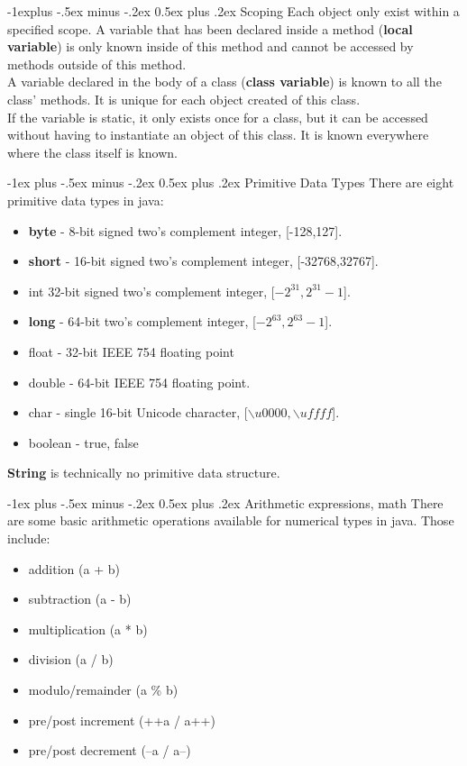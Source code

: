 \documentclass[10pt,landscape]{article}
\makeatletter
\renewcommand{\section}{\@startsection{section}{1}{0mm}%
                                {-1ex plus -.5ex minus -.2ex}%
                                {0.5ex plus .2ex}%
                                {\normalfont\large\bfseries}}
\renewcommand{\subsection}{\@startsection{subsection}{2}{0mm}%
                                {-1explus -.5ex minus -.2ex}%
                                {0.5ex plus .2ex}%
                                {\normalfont\normalsize\bfseries}}
\makeatother
\begin{document}
\begin{multicols}{3}
\subsection{Scoping}
Each object only exist within a specified scope. A variable that has been declared inside a method (\textbf{local variable}) is only known inside of this method and cannot be accessed by methods outside of this method.\\
A variable declared in the body of a class (\textbf{class variable}) is known to all the class' methods. It is unique for each object created of this class.\\
If the variable is static, it only exists once for a class, but it can be accessed without having to instantiate an object of this class. It is known everywhere where the class itself is known.

\section{Primitive Data Types}
There are eight primitive data types in java:
\begin{itemize}
\item \textbf{byte} - 8-bit signed two's complement integer, [-128,127].
\item \textbf{short} - 16-bit signed two's complement integer, [-32768,32767]. 
\item int 32-bit signed two's complement integer, [$-2^{31}, 2^{31}-1$].
\item \textbf{long} - 64-bit two's complement integer, [$-2^{63}, 2^{63}-1$].
\item float - 32-bit IEEE 754 floating point
\item double - 64-bit IEEE 754 floating point.
\item char - single 16-bit Unicode character, [$\backslash u0000, \backslash uffff$].
\item boolean - {true, false}
\end{itemize}
\textbf{String} is technically no primitive data structure.

\section{Arithmetic expressions, math}
There are some basic arithmetic operations available for numerical types in java. Those include:
\begin{itemize}
\item addition (a + b)
\item subtraction (a - b)
\item multiplication (a * b)
\item division (a / b)
\item modulo/remainder (a \% b)
\item pre/post increment (++a / a++)
\item pre/post decrement (--a / a--)
\end{itemize}


\end{multicols}
\end{document}
